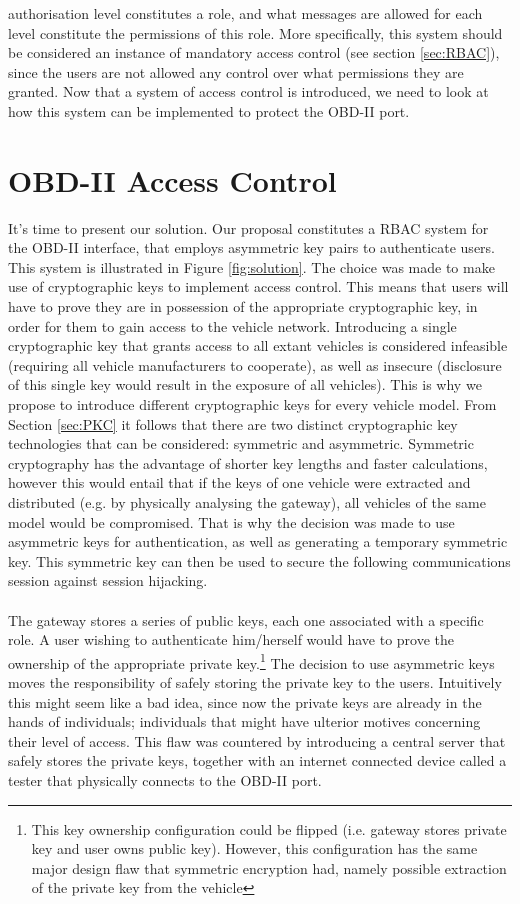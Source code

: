 authorisation level constitutes a role, and what messages are allowed for each level constitute the permissions of this role. More specifically, this system should be considered an instance of mandatory access control (see section \ref{sec:RBAC}), since the users are not allowed any control over what permissions they are granted. Now that a system of access control is introduced, we need to look at how this system can be implemented to protect the OBD-II port.

\section{OBD-II Access Control}
\label{sec:obd2_access_control}

It's time to present our solution. Our proposal constitutes a RBAC system for the OBD-II interface, that employs asymmetric key pairs to authenticate users. This system is illustrated in Figure \ref{fig:solution}. The choice was made to make use of cryptographic keys to implement access control. This means that users will have to prove they are in possession of the appropriate cryptographic key, in order for them to gain access to the vehicle network. Introducing a single cryptographic key that grants access to all extant vehicles is considered infeasible (requiring all vehicle manufacturers to cooperate), as well as insecure (disclosure of this single key would result in the exposure of all vehicles). This is why we propose to introduce different cryptographic keys for every vehicle model. From Section \ref{sec:PKC} it follows that there are two distinct cryptographic key technologies that can be considered: symmetric and asymmetric. Symmetric cryptography has the advantage of shorter key lengths and faster calculations, however this would entail that if the keys of one vehicle were extracted and distributed (e.g. by physically analysing the gateway), all vehicles of the same model would be compromised. That is why the decision was made to use asymmetric keys for authentication, as well as generating a temporary symmetric key. This symmetric key can then be used to secure the following communications session against session hijacking. \\ \\ The gateway stores a series of public keys, each one associated with a specific role. A user wishing to authenticate him/herself would have to prove the ownership of the appropriate private key.\footnote{This key ownership configuration could be flipped (i.e. gateway stores private key and user owns public key). However, this configuration has the same major design flaw that symmetric encryption had, namely possible extraction of the private key from the vehicle} The decision to use asymmetric keys moves the responsibility of safely storing the private key to the users. Intuitively this might seem like a bad idea, since now the private keys are already in the hands of individuals; individuals that might have ulterior motives concerning their level of access. This flaw was countered by introducing a central server that safely stores the private keys, together with an internet connected device called a tester that physically connects to the OBD-II port. 